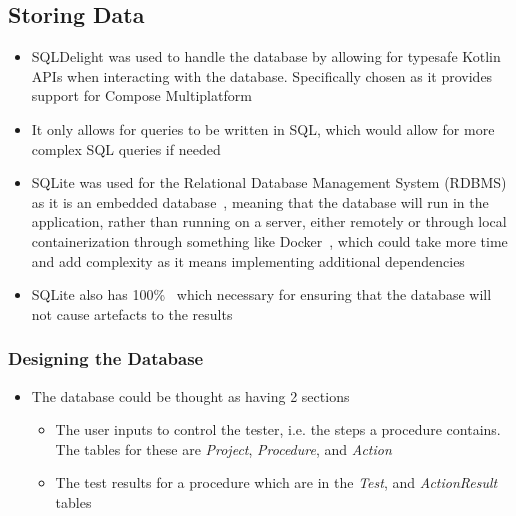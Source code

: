 \documentclass[../dissertation.tex]{subfiles}
\begin{document}

\subsection{Storing Data}
\begin{itemize}
  \item SQLDelight was used to handle the database by allowing for typesafe Kotlin APIs when interacting with the database.
    Specifically chosen as it provides support for Compose Multiplatform~\cite{sqldelight}
  \item It only allows for queries to be written in SQL, which would allow for more complex SQL queries if needed
  \item SQLite was used for the Relational Database Management System (RDBMS) as it is an embedded database~\cite{sqlite:about},
    meaning that the database will run in the application, rather than running on a server,
    either remotely or through local containerization through something like Docker~\cite{docker:container},
    which could take more time and add complexity as it means implementing additional dependencies
  \item SQLite also has 100\%~\cite{sqlite:tests} which necessary for ensuring that the database will
    not cause artefacts to the results
\end{itemize}

\subsubsection{Designing the Database}
\begin{itemize}
  \item The database could be thought as having 2 sections
    \begin{itemize}
      \item The user inputs to control the tester, i.e. the steps a procedure contains.
        The tables for these are \textit{Project}, \textit{Procedure}, and \textit{Action}
      \item The test results for a procedure which are in the \textit{Test}, and \textit{ActionResult} tables
    \end{itemize}
\end{itemize}
\end{document}
